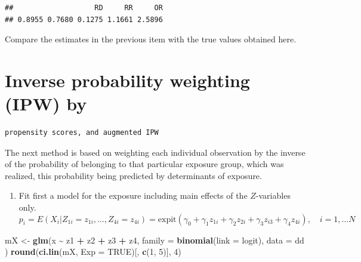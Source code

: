 \documentclass[
]{book}
\newenvironment{Shaded}{\begin{snugshade}}{\end{snugshade}}
\newcommand{\AttributeTok}[1]{\textcolor[rgb]{0.13,0.29,0.53}{#1}}
\newcommand{\ConstantTok}[1]{\textcolor[rgb]{0.56,0.35,0.01}{#1}}
\newcommand{\DecValTok}[1]{\textcolor[rgb]{0.00,0.00,0.81}{#1}}
\newcommand{\FunctionTok}[1]{\textcolor[rgb]{0.13,0.29,0.53}{\textbf{#1}}}
\newcommand{\NormalTok}[1]{#1}
\newcommand{\OtherTok}[1]{\textcolor[rgb]{0.56,0.35,0.01}{#1}}
\newcommand{\SpecialCharTok}[1]{\textcolor[rgb]{0.81,0.36,0.00}{\textbf{#1}}}
\providecommand{\tightlist}{%
  \setlength{\itemsep}{0pt}\setlength{\parskip}{0pt}}
\begin{document}
\begin{Shaded}
\end{Shaded}

\begin{verbatim}
##                   RD     RR     OR 
## 0.8955 0.7680 0.1275 1.1661 2.5896
\end{verbatim}

Compare the estimates in the previous item with the true values obtained
here.

\section{Inverse probability weighting (IPW) by}\label{inverse-probability-weighting-ipw-by}

\begin{verbatim}
propensity scores, and augmented IPW
\end{verbatim}

The next method is based on weighting each individual observation by the
inverse of the probability of belonging to that particular exposure
group, which was realized, this probability being predicted by
determinants of exposure.

\begin{enumerate}
\def\labelenumi{\arabic{enumi}.}
\tightlist
\item
  Fit first a model for the exposure including main effects of the
  \(Z\)-variables only. \[ 
  p_i = E(X_i| Z_{1i} = z_{1i}, \dots, Z_{4i} = z_{4i})
  = \text{expit}(\gamma_0 + \gamma_1 z_{1i} + \gamma_2 z_{2i} +
     \gamma_3 z_{i3} + \gamma_4 z_{4i} ), \quad i=1, \dots N 
  \]
\end{enumerate}

\begin{Shaded}
\begin{Highlighting}[]
\NormalTok{mX }\OtherTok{\textless{}{-}} \FunctionTok{glm}\NormalTok{(x }\SpecialCharTok{\textasciitilde{}}\NormalTok{ z1 }\SpecialCharTok{+}\NormalTok{ z2 }\SpecialCharTok{+}\NormalTok{ z3 }\SpecialCharTok{+}\NormalTok{ z4,}
  \AttributeTok{family =} \FunctionTok{binomial}\NormalTok{(}\AttributeTok{link =}\NormalTok{ logit), }\AttributeTok{data =}\NormalTok{ dd}
\NormalTok{)}
\FunctionTok{round}\NormalTok{(}\FunctionTok{ci.lin}\NormalTok{(mX, }\AttributeTok{Exp =} \ConstantTok{TRUE}\NormalTok{)[, }\FunctionTok{c}\NormalTok{(}\DecValTok{1}\NormalTok{, }\DecValTok{5}\NormalTok{)], }\DecValTok{4}\NormalTok{)}
\end{Highlighting}
\end{Shaded}
\end{document}
